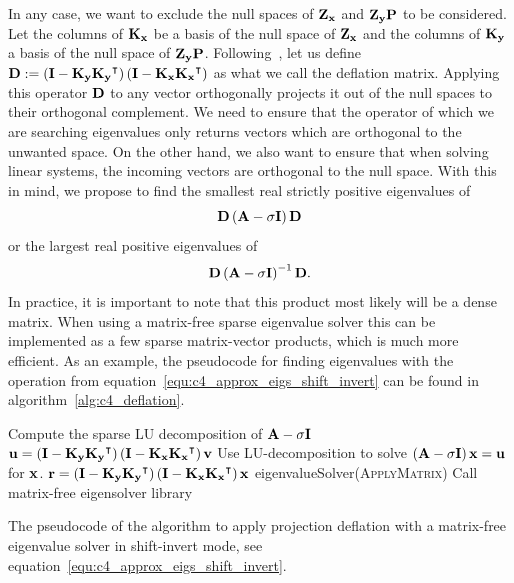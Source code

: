In any case, we want to exclude the null spaces of $\vb{Z_x}$ and $\vb{Z_y} \vb{P}$ to be considered. Let the columns of $\vb{K_x}$ be a basis of the null space of $\vb{Z_x}$ and the columns of $\vb{K_y}$ a basis of the null space of $\vb{Z_y}\vb{P}$. Following~\cite{saad_numerical_2011,mackey_deflation_2008}, let us define $\vb{D} := \left(\vb{I} - \vb{K_y} \vb{K_y}^\intercal\right) \left(\vb{I} - \vb{K_x} \vb{K_x}^\intercal\right)$ as what we call the deflation matrix. Applying this operator $\vb{D}$ to any vector orthogonally projects it out of the null spaces to their orthogonal complement. We need to ensure that the operator of which we are searching eigenvalues only returns vectors which are orthogonal to the unwanted space. On the other hand, we also want to ensure that when solving linear systems, the incoming vectors are orthogonal to the null space. With this in mind, we propose to find the smallest real strictly positive eigenvalues of
$$
    \vb{D} \left(\vb{A} - \sigma \vb{I}\right) \vb{D}
$$
or the largest real positive eigenvalues of
\begin{equation}\label{equ:c4_approx_eigs_shift_invert}
    \vb{D} \left(\vb{A} - \sigma \vb{I}\right)^{-1} \vb{D}\text{.}
\end{equation}
In practice, it is important to note that this product most likely will be a dense matrix. When using a matrix-free sparse eigenvalue solver this can be implemented as a few sparse matrix-vector products, which is much more efficient. As an example, the pseudocode for finding eigenvalues with the operation from equation~\eqref{equ:c4_approx_eigs_shift_invert} can be found  in algorithm~\ref{alg:c4_deflation}.
\begin{algorithm}
    \begin{algorithmic}
        \State Compute the sparse LU decomposition of $\vb{A} - \sigma \vb{I}$
        \State
        \State $\vb{u} = \left(\vb{I} - \vb{K_y} \vb{K_y}^\intercal\right) \left(\vb{I} - \vb{K_x} \vb{K_x}^\intercal\right) \vb{v}$
        \State Use LU-decomposition to solve $\left(\vb{A} - \sigma \vb{I}\right) \vb{x} = \vb{u}$ for $\vb{x}$.
        \State $\vb{r} = \left(\vb{I} - \vb{K_y} \vb{K_y}^\intercal\right) \left(\vb{I} - \vb{K_x} \vb{K_x}^\intercal\right) \vb{x}$
        \EndFunction
        \State
        \State eigenvalueSolver(\textsc{ApplyMatrix}) \Comment Call matrix-free eigensolver library
    \end{algorithmic}
    \caption{The pseudocode of the algorithm to apply projection deflation with a matrix-free eigenvalue solver in shift-invert mode, see equation~\eqref{equ:c4_approx_eigs_shift_invert}.}\label{alg:c4_deflation}
\end{algorithm}

